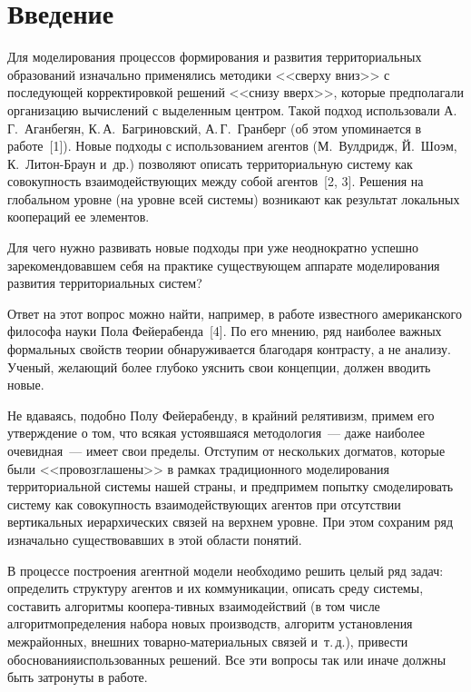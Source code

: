      \begin{multicols}{2}
      
            \label{st\stat}

\section{Введение}

  Для моделирования процессов формирования и развития территориальных 
образований изначально применялись методики <<сверху вниз>> с 
последующей корректировкой решений <<снизу вверх>>, которые 
предполагали организацию вычислений с выделенным центром. Такой подход 
использовали А.\,Г.~Аганбегян, К.\,А.~Багриновский, А.\,Г.~Гранберг (об этом 
упоминается в работе~[1]). Новые подходы с использованием агентов 
(М.~Вулдридж, Й.~Шоэм, К.~Ли\-тон-Бра\-ун и~др.) позволяют описать 
территориальную систему  как совокупность взаимодействующих между собой 
агентов~[2, 3]. Решения на глобальном уровне (на уровне всей системы) 
возникают как результат локальных коопераций ее элементов. 
  
  Для чего нужно развивать новые подходы при уже неоднократно успешно 
зарекомендовавшем себя на практике существующем аппарате моделирования 
развития территориальных систем?
  
  Ответ на этот вопрос можно найти, например, в работе известного 
американского философа науки Пола Фейерабенда~[4]. По его мнению, ряд 
наиболее важных формальных свойств теории обнаруживается благодаря 
контрасту, а не анализу. Ученый, желающий более глубоко уяснить свои 
концепции, должен вводить новые.
  
  Не вдаваясь, подобно Полу Фейерабенду, в крайний релятивизм, примем его 
утверждение о том, что всякая устоявшаяся методология~--- даже наиболее 
очевидная~--- имеет свои пределы. Отступим от нескольких догматов, которые 
были <<провозглашены>> в рамках традиционного моделирования 
территориальной системы нашей страны, и предпримем попытку смоделировать 
систему как совокупность взаимодействующих агентов при отсутствии 
вертикальных иерархических связей на верхнем уровне. При этом сохраним ряд 
изначально существовавших в этой области понятий. 
  
  В процессе построения агентной модели необходимо решить целый ряд 
задач: определить структуру агентов и их коммуникации, описать сре\-ду
системы, составить алгоритмы коопера-\linebreak тивных взаимодействий (в том чис\-ле 
алгоритм\linebreak определения набора новых производств, алгоритм установления 
межрайонных, внешних то\-вар\-но-ма\-те\-ри\-а\-льных связей и~т.\,д.), 
привести обоснования\linebreak использованных решений. Все эти вопросы так или 
иначе должны быть затронуты в работе.


\end{multicols}
